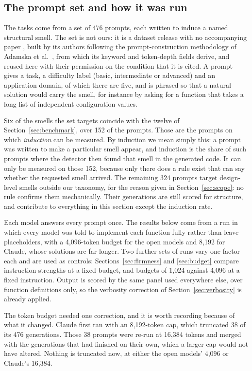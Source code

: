 \documentclass[10pt,a4paper,twocolumn]{article}
\begin{document}
\subsection{The prompt set and how it was run}
\label{sec:promptset}

The tasks come from a set of 476 prompts, each written to induce a named
structural smell. The set is not ours: it is a dataset release with no
accompanying paper \cite{codesmell2026}, built by its authors following the
prompt-construction methodology of Adamska et al.\ \cite{adamska2025green}, from
which its keyword and token-depth fields derive, and reused here with their
permission on the condition that it is cited. A prompt gives a task, a
difficulty label (basic, intermediate or advanced) and an application domain, of
which there are five, and is phrased so that a natural solution would carry the
smell, for instance by asking for a function that takes a long list of
independent configuration values.

Six of the smells the set targets coincide with the twelve of
Section~\ref{sec:benchmark}, over 152 of the prompts. Those are the prompts on
which \emph{induction} can be measured. By induction we mean simply this: a
prompt was written to make a particular smell appear, and induction is the share
of such prompts where the detector then found that smell in the generated code.
It can only be measured on those 152, because only there does a rule exist that
can say whether the requested smell arrived. The remaining 324 prompts target
design-level smells outside our taxonomy, for the reason given in
Section~\ref{sec:scope}: no rule confirms them mechanically. Their generations
are still scored for structure, and contribute to everything in this section
except the induction rate.

Each model answers every prompt once. The results below come from a run in which
every model was told to implement each function fully rather than leave
placeholders, with a 4{,}096-token budget for the open models and 8{,}192 for
Claude, whose solutions are far longer. Two further sets of runs vary one factor
each and are used as controls: Sections~\ref{sec:firmness} and \ref{sec:budget}
compare instruction strengths at a fixed budget, and budgets of 1{,}024 against
4{,}096 at a fixed instruction. Output is scored by the same panel used everywhere
else, over function definitions only, so the verbosity correction of
Section~\ref{sec:verbosity} is already applied.

The token budget needed one correction, and it is worth recording because of what
it changed. Claude first ran with an 8{,}192-token cap, which truncated 38 of its
476 generations. Those 38 prompts were re-run at 16{,}384 tokens and merged with
the generations that had finished on their own, which a larger cap would not have
altered. Nothing is truncated now, at either the open models' 4{,}096 or Claude's
16{,}384.
\end{document}

